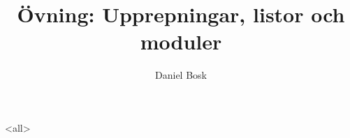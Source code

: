 \documentclass[ignoreframetext]{beamer}
\begin{document}
\title[Övning: upprepningar]{%
  Övning: Upprepningar, listor och moduler
}
\author{Daniel Bosk}

\begin{frame}
  \maketitle
\end{frame}

\mode<all>

\mode*
%
\end{document}
